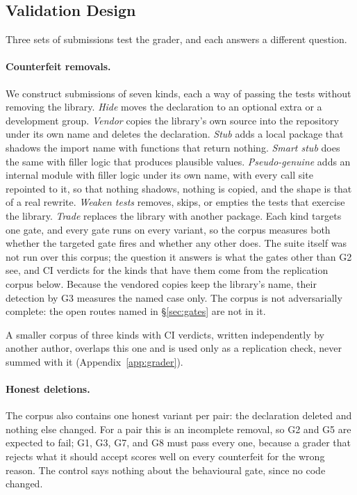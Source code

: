 \documentclass[11pt]{article}
\newif\ifdraft
\newcommand{\todo}[1]{\ifdraft\textcolor{red}{\textbf{[TODO: #1]}}\fi}
\begin{document}
\subsection{Validation Design}
\label{sec:validation}

Three sets of submissions test the grader, and each answers a different question.

\paragraph{Counterfeit removals.}
We construct submissions of seven kinds, each a way of passing the tests without removing the library.
\emph{Hide} moves the declaration to an optional extra or a development group.
\emph{Vendor} copies the library's own source into the repository under its own name and deletes the declaration.
\emph{Stub} adds a local package that shadows the import name with functions that return nothing.
\emph{Smart stub} does the same with filler logic that produces plausible values.
\emph{Pseudo-genuine} adds an internal module with filler logic under its own name, with every call site repointed to it, so that nothing shadows, nothing is copied, and the shape is that of a real rewrite.
\emph{Weaken tests} removes, skips, or empties the tests that exercise the library.
\emph{Trade} replaces the library with another package.
Each kind targets one gate, and every gate runs on every variant, so the corpus measures both whether the targeted gate fires and whether any other does.
The suite itself was not run over this corpus; the question it answers is what the gates other than G2 see, and CI verdicts for the kinds that have them come from the replication corpus below.
Because the vendored copies keep the library's name, their detection by G3 measures the named case only.
The corpus is not adversarially complete: the open routes named in \S\ref{sec:gates} are not in it.
\todo{Which pairs the corpus covers, how they were chosen, and whether it excludes the indirect track; who constructed it, with which generator, and whether that author worked on any gate (the corpus author also wrote G7 and G8 unless told otherwise, and that must be stated).}
A smaller corpus of three kinds with CI verdicts, written independently by another author, overlaps this one and is used only as a replication check, never summed with it (Appendix~\ref{app:grader}).

\paragraph{Honest deletions.}
The corpus also contains one honest variant per pair: the declaration deleted and nothing else changed.
For a pair this is an incomplete removal, so G2 and G5 are expected to fail; G1, G3, G7, and G8 must pass every one, because a grader that rejects what it should accept scores well on every counterfeit for the wrong reason.
The control says nothing about the behavioural gate, since no code changed.
\end{document}
